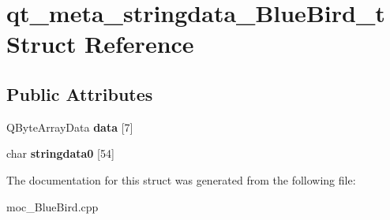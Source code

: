 \hypertarget{structqt__meta__stringdata__BlueBird__t}{}\section{qt\+\_\+meta\+\_\+stringdata\+\_\+\+Blue\+Bird\+\_\+t Struct Reference}
\label{structqt__meta__stringdata__BlueBird__t}
\subsection*{Public Attributes}
\begin{DoxyCompactItemize}
\item 
Q\+Byte\+Array\+Data {\bfseries data} \mbox{[}7\mbox{]}\hypertarget{structqt__meta__stringdata__BlueBird__t_aaaf00ed7b3c9a686945dab8de652d386}{}\label{structqt__meta__stringdata__BlueBird__t_aaaf00ed7b3c9a686945dab8de652d386}

\item 
char {\bfseries stringdata0} \mbox{[}54\mbox{]}\hypertarget{structqt__meta__stringdata__BlueBird__t_aa9cc3b163d67256197fcadfa69aa6575}{}\label{structqt__meta__stringdata__BlueBird__t_aa9cc3b163d67256197fcadfa69aa6575}

\end{DoxyCompactItemize}


The documentation for this struct was generated from the following file\+:\begin{DoxyCompactItemize}
\item 
moc\+\_\+\+Blue\+Bird.\+cpp\end{DoxyCompactItemize}
